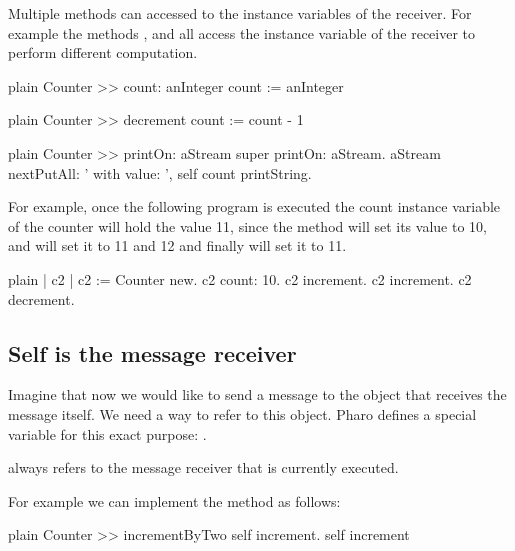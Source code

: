\documentclass[10pt,twoside,english]{_support/latex/sbabook/sbabook}
\begin{document}
Multiple methods can accessed to the instance variables of the receiver. For example the methods ,   and  all access the instance variable  of the receiver to perform different computation. 

\begin{displaycode}{plain}
Counter >> count: anInteger
	count := anInteger
\end{displaycode}

\begin{displaycode}{plain}
Counter >> decrement
	count := count - 1
\end{displaycode}

\begin{displaycode}{plain}
Counter >> printOn: aStream
   super printOn: aStream.
   aStream nextPutAll: ' with value: ', self count printString.
\end{displaycode}

For example, once the following program is executed the count  instance variable of the counter  will hold the value 11, since the method  will set its value to 10, and  will set it to 11 and 12 and finally  will set it to 11. 

\begin{displaycode}{plain}
| c2 |
c2 := Counter new.
c2 count: 10.
c2 increment.
c2 increment.
c2 decrement.
\end{displaycode}
\subsection{Self is the message receiver}
Imagine that now we would like to send a message to the object that receives the message itself. We need a way to refer to this object. Pharo defines a special variable for this exact purpose: . 

\begin{important}
 always refers to the message receiver that is currently executed.
\end{important}

For example we can implement the method  as follows:

\begin{displaycode}{plain}
Counter >> incrementByTwo
	self increment. 
	self increment
\end{displaycode}
\end{document}
